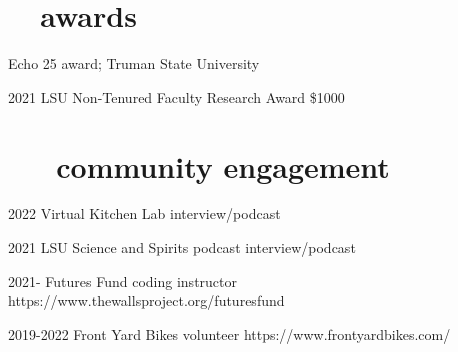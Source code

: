\documentclass[]{CV}
\begin{document}
{%





\section{\faTrophy \ \ awards}
\begin{entrylist}

 {Echo 25 award; Truman State University}
 {}
 

 \entry
 {2021}
 {LSU Non-Tenured Faculty Research Award}
 {\$1000}

\end{entrylist}











\section{ \faUserPlus \ \ \ community engagement}

\begin{entrylist}




 \entry
	 {2022}
	 {Virtual Kitchen Lab}
	 {interview/podcast}

 \entry
	 {2021}
	 {LSU Science and Spirits podcast}
	 {interview/podcast}
 
 \entry
	 {2021-}
	 {Futures Fund coding instructor}
	 {https://www.thewallsproject.org/futuresfund}

 \entry
	 {2019-2022}
	 {Front Yard Bikes volunteer}
	 {https://www.frontyardbikes.com/}


\end{entrylist}}
\end{document}
